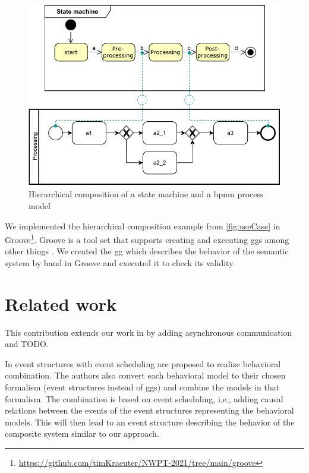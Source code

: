 \documentclass[a4paper]{easychair}
\begin{document}
\begin{figure}[h]
    \centering
    \includegraphics[width=.5\textwidth]{images/usecase.pdf}
    \caption{Hierarchical composition of a state machine and a \gls{bpmn} process model}
    \label{fig:useCase}
\end{figure}
We implemented the hierarchical composition example from \autoref{fig:useCase} in Groove\footnote{\url{https://github.com/timKraeuter/NWPT-2021/tree/main/groove}}. %
Groove is a tool set that supports creating and executing \glspl{gg} among other things \cite{ghamarianModellingAnalysisUsing2012, rensinkGROOVESimulatorTool2004}.
We created the \gls{gg} which describes the behavior of the semantic system by hand in Groove and executed it to check its validity.

\section{Related work}
This contribution extends our work in \cite{krauterBehavioralConsistencyHeterogeneous2021} by adding asynchronous communication and TODO.

In \cite{kienzleUnifyingFrameworkHomogeneous2019} event structures with event scheduling are proposed to realize behavioral combination.
The authors also convert each behavioral model to their chosen formalism (event structures instead of \glspl{gg}) and combine the models in that formalism.
The combination is based on event scheduling, i.e., adding causal relations between the events of the event structures representing the behavioral models.
This will then lead to an event structure describing the behavior of the composite system similar to our approach.

\end{document}
